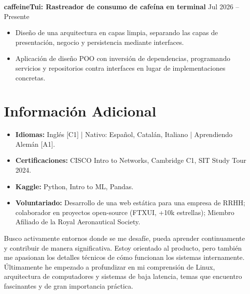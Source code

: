 \documentclass[11pt, a4paper]{article}
\begin{document}
\vspace{0.8em}

\textbf{caffeineTui: Rastreador de consumo de cafeína en terminal} \hfill Jul 2026 -- Presente
\begin{itemize}
    \item Diseño de una arquitectura en capas limpia, separando las capas de presentación, negocio y persistencia mediante interfaces.
    \item Aplicación de diseño POO con inversión de dependencias, programando servicios y repositorios contra interfaces en lugar de implementaciones concretas.
\end{itemize}

\section{Información Adicional}
\begin{itemize}
    \item \textbf{Idiomas:} Inglés [C1] | Nativo: Español, Catalán, Italiano | Aprendiendo Alemán [A1].
    \item \textbf{Certificaciones:} CISCO Intro to Networks, Cambridge C1, SIT Study Tour 2024.
    \item \textbf{Kaggle:} Python, Intro to ML, Pandas.
    \item \textbf{Voluntariado:} Desarrollo de una web estática para una empresa de RRHH; colaborador en proyectos open-source (FTXUI, +10k estrellas); Miembro Afiliado de la Royal Aeronautical Society.
\end{itemize}

\vspace{0.4em}
\begin{flushleft}
{\small Busco activamente entornos donde se me desafíe, pueda aprender continuamente y contribuir de manera significativa. Estoy orientado al producto, pero también me apasionan los detalles técnicos de cómo funcionan los sistemas internamente. Últimamente he empezado a profundizar en mi comprensión de Linux, arquitectura de computadores y sistemas de baja latencia, temas que encuentro fascinantes y de gran importancia práctica.}
\end{flushleft}
\end{document}
